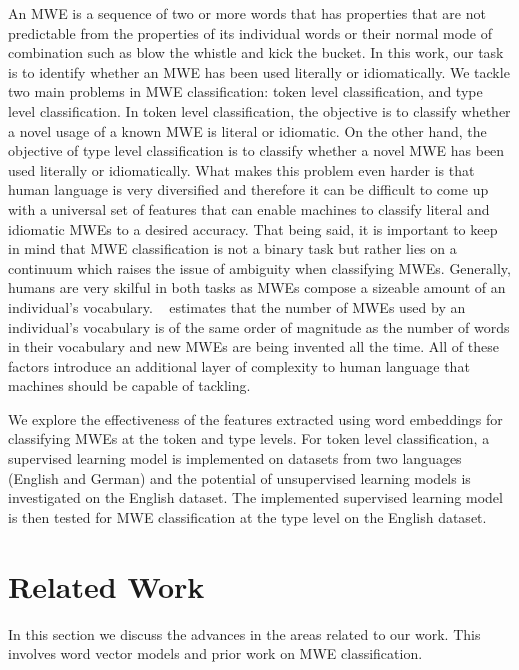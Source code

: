 \documentclass[11pt]{article}
\begin{document}
An MWE is a sequence of two or more words that has properties that are not predictable from the properties of its individual words or their normal mode of combination such as blow the whistle and kick the bucket. In this work, our task is to identify whether an MWE has been used literally or idiomatically. We tackle two main problems in MWE classification: token level classification, and type level classification. In token level classification, the objective is to classify whether a novel usage of a known MWE is literal or idiomatic. On the other hand, the objective of type level classification is to classify whether a novel MWE has been used literally or idiomatically. What makes this problem even harder is that human language is very diversified and therefore it can be difficult to come up with a universal set of features that can enable machines to classify literal and idiomatic MWEs to a desired accuracy. That being said, it is important to keep in mind that MWE classification is not a binary task but rather lies on a continuum which raises the issue of ambiguity when classifying MWEs. Generally, humans are very skilful in both tasks as MWEs compose a sizeable amount of an individual's vocabulary.  ~\cite{jackendoff1997architecture} estimates that the number of MWEs used by an individual's vocabulary is of the same order of magnitude as the number of words in their vocabulary and new MWEs are being invented all the time. All of these factors introduce an additional layer of complexity to human language that machines should be capable of tackling. 

We explore the effectiveness of the features extracted using word embeddings for classifying MWEs at the token and type levels. For token level classification, a supervised learning model is implemented on datasets from two languages (English and German) and the potential of unsupervised learning models is investigated on the English dataset. The implemented supervised learning model is then tested for MWE classification at the type level on the English dataset. 


\section{Related Work}

In this section we discuss the advances in the areas related to our work. This involves word vector models and prior work on MWE classification.  
\end{document}

